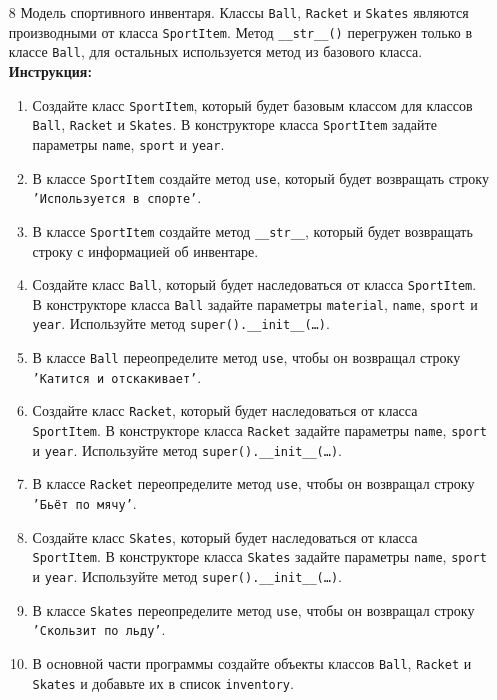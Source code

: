 \begin{enumerate}
\begin{enumerate}
\end{enumerate}
\item[8]
Модель спортивного инвентаря. Классы \texttt{Ball}, \texttt{Racket} и \texttt{Skates} являются производными от класса \texttt{SportItem}. Метод \texttt{\_\_str\_\_()} перегружен только в классе \texttt{Ball}, для остальных используется метод из базового класса.
\textbf{Инструкция:}
\begin{enumerate}
    \item Создайте класс \texttt{SportItem}, который будет базовым классом для классов \texttt{Ball}, \texttt{Racket} и \texttt{Skates}. В конструкторе класса \texttt{SportItem} задайте параметры \texttt{name}, \texttt{sport} и \texttt{year}.
    \item В классе \texttt{SportItem} создайте метод \texttt{use}, который будет возвращать строку \texttt{'Используется в спорте'}.
    \item В классе \texttt{SportItem} создайте метод \texttt{\_\_str\_\_}, который будет возвращать строку с информацией об инвентаре.
    \item Создайте класс \texttt{Ball}, который будет наследоваться от класса \texttt{SportItem}. В конструкторе класса \texttt{Ball} задайте параметры \texttt{material}, \texttt{name}, \texttt{sport} и \texttt{year}. Используйте метод \texttt{super().\_\_init\_\_(\ldots)}.
    \item В классе \texttt{Ball} переопределите метод \texttt{use}, чтобы он возвращал строку \texttt{'Катится и отскакивает'}.
    \item Создайте класс \texttt{Racket}, который будет наследоваться от класса \texttt{SportItem}. В конструкторе класса \texttt{Racket} задайте параметры \texttt{name}, \texttt{sport} и \texttt{year}. Используйте метод \texttt{super().\_\_init\_\_(\ldots)}.
    \item В классе \texttt{Racket} переопределите метод \texttt{use}, чтобы он возвращал строку \texttt{'Бьёт по мячу'}.
    \item Создайте класс \texttt{Skates}, который будет наследоваться от класса \texttt{SportItem}. В конструкторе класса \texttt{Skates} задайте параметры \texttt{name}, \texttt{sport} и \texttt{year}. Используйте метод \texttt{super().\_\_init\_\_(\ldots)}.
    \item В классе \texttt{Skates} переопределите метод \texttt{use}, чтобы он возвращал строку \texttt{'Скользит по льду'}.
    \item В основной части программы создайте объекты классов \texttt{Ball}, \texttt{Racket} и \texttt{Skates} и добавьте их в список \texttt{inventory}.

\end{enumerate}
\end{enumerate}
